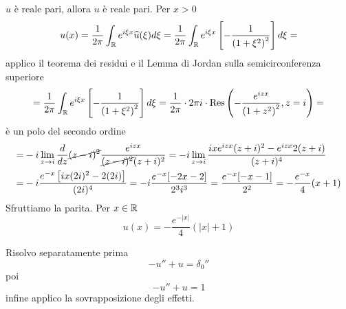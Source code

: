 $\hat{u}$ è reale pari, allora $u$ è reale pari. Per $x > 0$
\begin{equation*}
u(x) = \frac{1}{2\pi}\int_{\mathbb{R}} e^{i\xi x}\widehat{u}(\xi) d\xi = \frac{1}{2\pi}\int_{\mathbb{R}} e^{i\xi x}\left[ - \frac{1}{\left(1 + \xi^{2}\right)^{2}}\right] d\xi =
\end{equation*}
applico il teorema dei residui e il Lemma di Jordan sulla semicirconferenza superiore
\begin{equation*}
= \frac{1}{2\pi}\int_{\mathbb{R}} e^{i\xi x}\left[ - \frac{1}{\left(1 + \xi^{2}\right)^{2}}\right] d\xi = \frac{1}{2\pi} \cdot 2\pi i \cdot \operatorname{Res} \left(- \frac{e^{izx}}{\left(1 + z^{2}\right)^{2}}, z = i\right) =
\end{equation*}
è un polo del secondo ordine
\begin{equation*}
\begin{aligned}
= & - i\lim\limits_{z\rightarrow i}\frac{d}{dz}\cancel{(z - i)^{2}}\frac{e^{izx}}{\cancel{(z - i)^{2}}(z + i)^{2}} = - i\lim\limits_{z\rightarrow i}\frac{ixe^{izx}(z + i)^{2} - e^{izx} 2(z + i)}{(z + i)^{4}}\\
= & - i\frac{e^{- x}\left[ ix(2i)^{2} - 2(2i)\right]}{(2i)^{4}} = - i\frac{e^{- x}[ - 2x - 2]}{2^{3} i^{3}} = \frac{e^{- x}[ - x - 1]}{2^{2}} = - \frac{e^{- x}}{4}(x + 1)
\end{aligned}
\end{equation*}
Sfruttiamo la parita. Per $x\in \mathbb{R} $
\begin{equation*}
u(x) = - \frac{e^{- | x|}}{4}(| x| + 1)
\end{equation*}

\Soluzione

Risolvo separatamente prima
\begin{equation*}
- u'' + u = \delta_{0}''
\end{equation*}
poi
\begin{equation*}
- u'' + u = 1
\end{equation*}
infine applico la sovrapposizione degli effetti.

